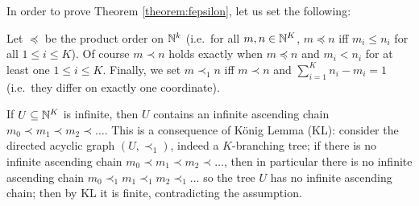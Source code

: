 In order to prove Theorem \ref{theorem:fepsilon}, let us set the following:
\begin{definition}
 Let $\preceq$ be the product order on $\mathbb{N}^k$ (i.e.\ for all $ m  , n  \in \mathbb{N}^{K}$, $ m  \preceq  n  $ iff $m_{i}\leq n_{i}$ for all $1\leq i\leq K$).
 Of course $ m  \prec  n  $ holds exactly when $ m  \preceq  n  $ and $m_{i}<n_{i}$ for at least one $1\leq i\leq K$.
 Finally, we set $ m  \prec_{1} n  $  iff
$ m  \prec  n  $ and $\sum_{i=1}^{K}n_{i}-m_{i}=1$ (i.e.\ they differ on exactly one coordinate).
\end{definition}


\begin{remark}\label{rmk:AC}
If $U\subseteq \mathbb{N}^{K}$ is infinite, then $U$ contains an infinite ascending chain $ m  _{0}\prec  m  _{1} \prec  m  _{2} \prec \dots$.
This is a consequence of K\"onig Lemma (KL): consider the directed acyclic graph $(U,\prec_{1})$, indeed a $K$-branching tree; if there is no infinite ascending chain $  m  _{0}\prec  m  _{1} \prec  m  _{2} \prec \dots$, then in particular there is no infinite ascending chain $  m  _{0}\prec_{1}  m  _{1} \prec_{1}  m  _{2} \prec_{1} \dots$ so the tree $U$ has no infinite ascending chain; then by KL it is finite, contradicting the assumption. 
\end{remark}


